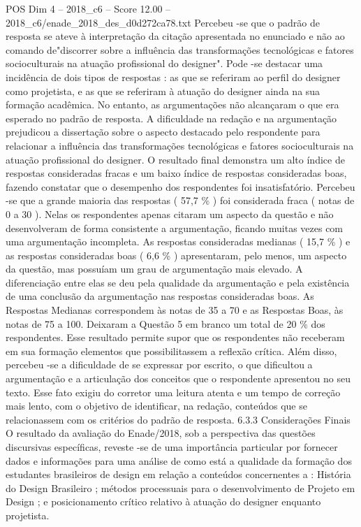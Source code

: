 \begin{textsample}{POS Dim 4 – 2018\_c6 – Score 12.00 – 2018\_c6/enade\_2018\_des\_d0d272ca78.txt}
Percebeu -se que o padrão de resposta se ateve à interpretação da citação apresentada no enunciado e não ao comando de"discorrer sobre a influência das transformações tecnológicas e fatores socioculturais na atuação profissional do designer".
Pode -se destacar uma incidência de dois tipos de respostas : as que se referiram ao perfil do designer como projetista, e as que se referiram à atuação do designer ainda na sua formação acadêmica.
No entanto, as argumentações não alcançaram o que era esperado no padrão de resposta.
A dificuldade na redação e na argumentação prejudicou a dissertação sobre o aspecto destacado pelo respondente para relacionar a influência das transformações tecnológicas e fatores socioculturais na atuação profissional do designer.
O resultado final demonstra um alto índice de respostas consideradas fracas e um baixo índice de respostas consideradas boas, fazendo constatar que o desempenho dos respondentes foi insatisfatório.
Percebeu -se que a grande maioria das respostas ( 57,7 \% ) foi considerada fraca ( notas de 0 a 30 ).
Nelas os respondentes apenas citaram um aspecto da questão e não desenvolveram de forma consistente a argumentação, ficando muitas vezes com uma argumentação incompleta.
As respostas consideradas medianas ( 15,7 \% ) e as respostas consideradas boas ( 6,6 \% ) apresentaram, pelo menos, um aspecto da questão, mas possuíam um grau de argumentação mais elevado.
A diferenciação entre elas se deu pela qualidade da argumentação e pela existência de uma conclusão da argumentação nas respostas consideradas boas.
As Respostas Medianas correspondem às notas de 35 a 70 e as Respostas Boas, às notas de 75 a 100.
Deixaram a Questão 5 em branco um total de 20 \% dos respondentes.
Esse resultado permite supor que os respondentes não receberam em sua formação elementos que possibilitassem a reflexão crítica.
Além disso, percebeu -se a dificuldade de se expressar por escrito, o que dificultou a argumentação e a articulação dos conceitos que o respondente apresentou no seu texto.
Esse fato exigiu do corretor uma leitura atenta e um tempo de correção mais lento, com o objetivo de identificar, na redação, conteúdos que se relacionassem com os critérios do padrão de resposta. 6.3.3 Considerações Finais O resultado da avaliação do Enade/2018, sob a perspectiva das questões discursivas específicas, reveste -se de uma importância particular por fornecer dados e informações para uma análise de como está a qualidade da formação dos estudantes brasileiros de design em relação a conteúdos concernentes a : História do Design Brasileiro ; métodos processuais para o desenvolvimento de Projeto em Design ; e posicionamento crítico relativo à atuação do designer enquanto projetista.

\end{textsample}
